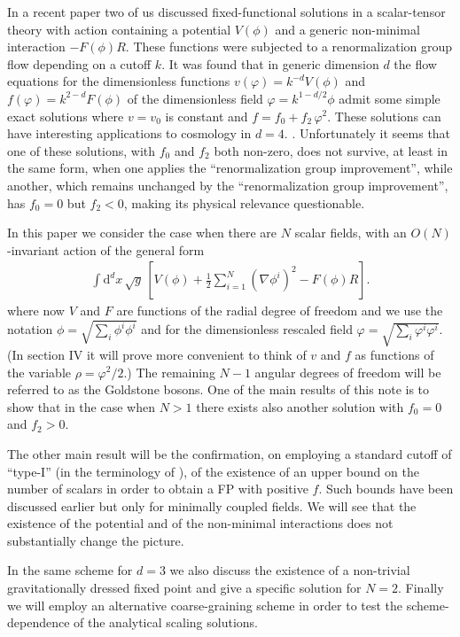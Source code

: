 \documentclass[11pt]{book} %
\numberwithin{equation}{chapter}
\begin{document}
In a recent paper \cite{Percacci:2015wwa} two of us discussed
fixed-functional solutions
in a scalar-tensor theory with action containing a potential $V(\phi)$
and a generic non-minimal interaction $-F(\phi)R$.
These functions were subjected to a renormalization group flow
depending on a cutoff $k$.
It was found that in generic dimension $d$ the flow equations for the dimensionless
functions $v(\varphi)=k^{-d}V(\phi)$ and $f(\varphi)=k^{2-d}F(\phi)$
of the dimensionless field $\varphi=k^{1-d/2}\phi$
admit some simple exact solutions where $v=v_0$ is constant and
$f=f_0 + f_2 \, \varphi^2$.
These solutions can have interesting applications to cosmology in $d=4$.
\cite{Henz:2013oxa}.
Unfortunately it seems that one of these solutions,
with $f_0$ and $f_2$ both non-zero, does not survive,
at least in the same form, when one applies the
``renormalization group improvement'',
while another, which remains unchanged by the
``renormalization group improvement'',
has $f_0=0$ but $f_2<0$, making its physical relevance questionable.

In this paper we consider the case when
there are $N$ scalar fields, with an $O(N)$-invariant
action of the general form
\begin{align}
  \label{action}
  \int \mathrm d^dx \, \sqrt{g} \,
  \left[ V(\phi) + \frac{1}{2}\sum_{i=1}^N \left( \nabla\phi^i \right)^2 - F(\phi)R \right] .
\end{align}
where now $V$ and $F$ are functions of the radial degree of freedom
and we use the notation $\phi=\sqrt{\sum_i \phi^i\phi^i}$ and for the dimensionless rescaled field
$\varphi=\sqrt{\sum_i \varphi^i \varphi^i}$.
(In section IV it will prove more convenient to think of
$v$ and $f$ as functions of the variable $\rho=\varphi^2/2$.)
The remaining $N-1$ angular degrees
of freedom will be referred to as the Goldstone bosons.
One of the main results of this note is to show that in the case
when $N>1$ there exists also another solution with $f_0=0$ and $f_2>0$.

The other main result will be the confirmation,
on employing a standard cutoff of ``type-I''
(in the terminology of \cite{Codello:2008vh}),
of the existence  of an upper bound on the number of scalars in order to obtain a FP with positive $f$.
Such bounds have been discussed earlier but only for minimally
coupled fields.
We will see that the existence of the potential and of the non-minimal interactions does
not substantially change the picture.

In the same scheme for $d=3$ we also discuss the existence
of a non-trivial gravitationally dressed fixed point
and give a specific solution for $N=2$.
Finally we will employ an alternative coarse-graining scheme
in order to test the scheme-dependence of the analytical scaling solutions.
\end{document}
